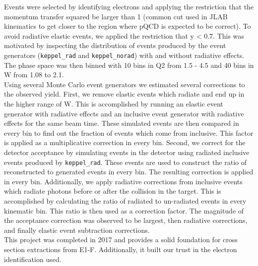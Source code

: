 Events were selected by identifying electrons and applying the restriction that the momentum transfer squared be larger than 1 (common cut used in JLAB kinematics to get closer to the region where pQCD is expected to be correct).  To avoid radiative elastic events, we applied the restriction that y < 0.7.  This was motivated by inspecting the distribution of events produced by the event generators (\texttt{keppel\_rad} and \texttt{keppel\_norad}) with and without radiative effects.  The phase space was then binned with 10 bins in Q2 from 1.5 - 4.5 and 40 bins in W from 1.08 to 2.1.  \\

Using several Monte Carlo event generators we estimated several corrections to the observed yield.  First, we remove elastic events which radiate and end up in the higher range of W.  This is accomplished by running an elastic event generator with radiative effects and an inclusive event generator with radiative effects for the same beam time.  These simulated events are then compared in every bin to find out the fraction of events which come from inclusive.  This factor is applied as a multiplicative correction in every bin.  Second, we correct for the detector acceptance by simulating events in the detector using radiated inclusive events produced by \texttt{keppel\_rad}.  These events are used to construct the ratio of reconstructed to generated events in every bin.  The resulting correction is applied in every bin.  Additionally, we apply radiative corrections from inclusive events which radiate photons before or after the collision in the target.  This is accomplished by calculating the ratio of radiated to un-radiated events in every kinematic bin.  This ratio is then used as a correction factor.  The magnitude of the acceptance correction was observed to be largest, then radiative corrections, and finally elastic event subtraction corrections.  \\
This project was completed in 2017 and provides a solid foundation for cross section extractions from E1-F.  Additionally, it built our trust in the electron identification used.

